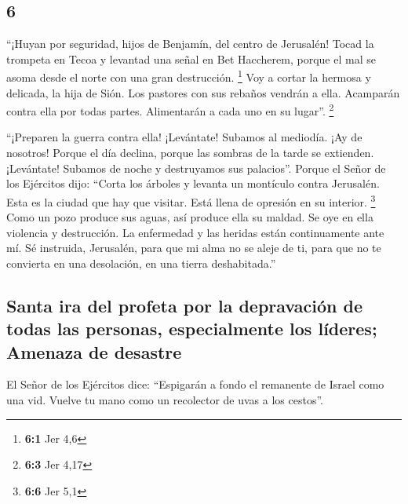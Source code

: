 \begin{paracol}{2}
\hypertarget{section-10}{%
\section{6}\label{section-10}}

 ``¡Huyan por seguridad, hijos de Benjamín, del centro de
Jerusalén! Tocad la trompeta en Tecoa y levantad una señal en Bet
Haccherem, porque el mal se asoma desde el norte con una gran
destrucción. \footnote{\textbf{6:1} Jer 4,6}  Voy a cortar
la hermosa y delicada, la hija de Sión.  Los pastores con
sus rebaños vendrán a ella. Acamparán contra ella por todas partes.
Alimentarán a cada uno en su lugar''. \footnote{\textbf{6:3} Jer 4,17}

 ``¡Preparen la guerra contra ella! ¡Levántate! Subamos al
mediodía. ¡Ay de nosotros! Porque el día declina, porque las sombras de
la tarde se extienden.  ¡Levántate! Subamos de noche y
destruyamos sus palacios''.  Porque el Señor de los
Ejércitos dijo: ``Corta los árboles y levanta un montículo contra
Jerusalén. Esta es la ciudad que hay que visitar. Está llena de opresión
en su interior. \footnote{\textbf{6:6} Jer 5,1}  Como un
pozo produce sus aguas, así produce ella su maldad. Se oye en ella
violencia y destrucción. La enfermedad y las heridas están continuamente
ante mí.  Sé instruida, Jerusalén, para que mi alma no se
aleje de ti, para que no te convierta en una desolación, en una tierra
deshabitada.''

\hypertarget{santa-ira-del-profeta-por-la-depravaciuxf3n-de-todas-las-personas-especialmente-los-luxedderes-amenaza-de-desastre}{%
\subsection{Santa ira del profeta por la depravación de todas las
personas, especialmente los líderes; Amenaza de
desastre}\label{santa-ira-del-profeta-por-la-depravaciuxf3n-de-todas-las-personas-especialmente-los-luxedderes-amenaza-de-desastre}}

 El Señor de los Ejércitos dice: ``Espigarán a fondo el
remanente de Israel como una vid. Vuelve tu mano como un recolector de
uvas a los cestos''.


\end{paracol}
